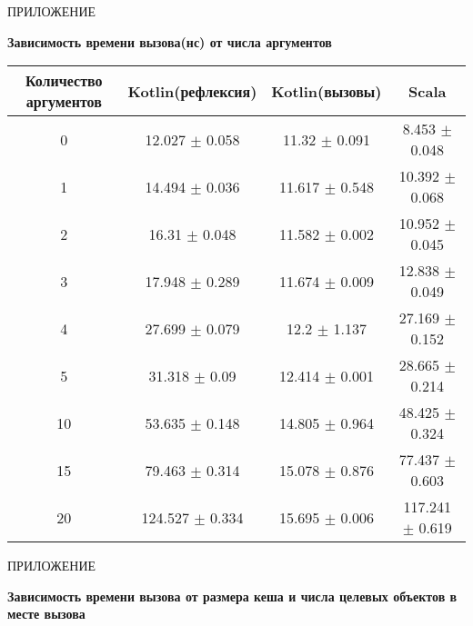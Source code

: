 \vfill
\clearpage
\appendix

    \hfill ПРИЛОЖЕНИЕ 
    \begin{center}
        \bf{Зависимость времени вызова(нс) от числа аргументов}
    \end{center}
    \markboth{\MakeUppercase{}}{}

\begin{table}[H]
\begin{center}
\begin{tabular}{|c|c|c|c|} \hline
Количество аргументов & Kotlin(рефлексия) &  Kotlin(вызовы) & Scala \\ \hline
0 & 12.027 $\pm$ 0.058 & 11.32 $\pm$ 0.091 & 8.453 $\pm$ 0.048 \\ \hline
1 & 14.494 $\pm$ 0.036 & 11.617 $\pm$ 0.548 & 10.392 $\pm$ 0.068 \\ \hline
2 & 16.31 $\pm$ 0.048 & 11.582 $\pm$ 0.002 & 10.952 $\pm$ 0.045 \\ \hline
3 & 17.948 $\pm$ 0.289 & 11.674 $\pm$ 0.009 & 12.838 $\pm$ 0.049 \\ \hline
4 & 27.699 $\pm$ 0.079 & 12.2 $\pm$ 1.137 & 27.169 $\pm$ 0.152 \\ \hline
5 & 31.318 $\pm$ 0.09 & 12.414 $\pm$ 0.001 & 28.665 $\pm$ 0.214 \\ \hline
10 & 53.635 $\pm$ 0.148 & 14.805 $\pm$ 0.964 & 48.425 $\pm$ 0.324 \\ \hline
15 & 79.463 $\pm$ 0.314 & 15.078 $\pm$ 0.876 & 77.437 $\pm$ 0.603 \\ \hline
20 & 124.527 $\pm$ 0.334 & 15.695 $\pm$ 0.006 & 117.241 $\pm$ 0.619 \\ \hline
\end{tabular}
\end{center}
\end{table}


\newpage

    \hfill ПРИЛОЖЕНИЕ 
    \begin{center}
        \bf{Зависимость времени вызова от размера кеша и числа целевых объектов в месте вызова}
    \end{center}
    \markboth{\MakeUppercase{}}{}

